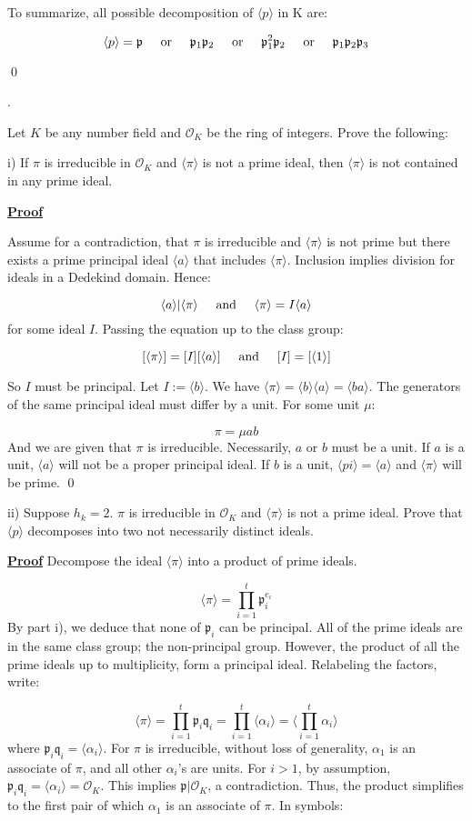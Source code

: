 \documentclass{article}
\def\contradiction{{\lightning}}
\newcounter{problemcnt}
\newcommand{\Problem}{{
    \vspace{5mm}
    \stepcounter{problemcnt}
    \noindent
    \arabic{problemcnt}. 
}
}
\newcommand{\Proof}{{
    \vspace{2mm}
    \noindent
    \textbf{
    \underline{Proof}}
}
}
\newcommand{\textOr}{
    \hspace{5mm}
    \textrm{or}
    \hspace{5mm}
}
\newcommand{\textAnd}{
    \hspace{5mm}
    \textrm{and}
    \hspace{5mm}
}
\newcommand{\<}{{{
    \langle
}}}
\def\>{{{
    \rangle
}}}
\newcommand{\ringInt}{
    {\mathcal{O}}
}
\newcommand{\pideal}{
    {{\mathfrak{p}}}
}
\newcommand{\qideal}{
    {{\mathfrak{q}}}
}
\begin{document}
To summarize, all possible decomposition of $\<p\>$ in K are:

\[
\<p\> = \pideal \textOr \pideal_1 \pideal_2 
 \textOr \pideal^2_1\pideal_2 \textOr \pideal_1\pideal_2\pideal_3
\]

\qed

\Problem 
Let $K$ be any number field and $\ringInt_K$ be the ring of integers. 
Prove the following:

i) If $\pi$ is irreducible in $\ringInt_K$ and $\<\pi\>$ is not 
a prime ideal, then $\<\pi\>$ is not contained in any prime ideal.

\Proof
Assume for a contradiction, that $\pi$ is irreducible and $\<\pi\>$ 
is not prime but there exists a prime principal ideal $\<a\>$ that includes  
$\<\pi\>$. Inclusion implies division for ideals in a Dedekind domain. Hence:

\[
    \<a\>|\<\pi\> \textAnd \<\pi\> = I\<a\>
\]
for some ideal $I$. Passing the equation up to the class group:

\[
    [\<\pi\>] = [I][\<a\>] \textAnd [I] = [\<1\>]
\]

So $I$ must be principal. Let $I := \<b\>$. We have 
$\<\pi\> = \<b\>\<a\> = \<ba\>$. The generators of the same 
principal ideal must differ by a unit. For some unit $\mu$:

\[
    \pi = \mu ab 
\]
And we are given that $\pi$ is irreducible. Necessarily, 
$a$ or $b$ must be a unit. If $a$ is a unit, $\<a\>$ will not 
be a proper principal ideal. If $b$ is a unit, $\<pi\> = \<a\>$ 
and $\<\pi\>$ will be prime. \contradiction \qed

ii) Suppose $h_k = 2$. $\pi$ is irreducible in $\ringInt_K$ and 
$\<\pi\>$ is not a prime ideal. Prove that $\<p\>$ decomposes 
into two not necessarily distinct ideals. 

\Proof Decompose the ideal $\<\pi\>$ into a product of prime ideals. 

\[
    \<\pi\> = \prod_{i = 1}^{t}\pideal_i^{e_i}
\]
By part i), we deduce that none of $\pideal_i$ can be principal. 
All of the prime ideals are in the same class group; the non-principal 
group. However, the product of all the prime ideals up to multiplicity, 
form a principal ideal. Relabeling the factors, write:

\[
    \<\pi\> = \prod_{i = 1}^t \pideal_i \qideal_i = \prod_{i = 1}^t\<\alpha_i\>
    = 
    \bigg\langle
    \prod_{i = 1}^t\alpha_i
    \bigg\rangle
\]
where $\pideal_i\qideal_i = \<\alpha_i\>$. For $\pi$ is irreducible, 
without loss of generality, $\alpha_1$ is an associate of $\pi$, 
and all other $\alpha_i$'s are units. For $i > 1$, by assumption, $\pideal_i\qideal_i = \<\alpha_i\> = 
\ringInt_K$. This implies $\pideal|\ringInt_K$, a contradiction. 
Thus, the product simplifies to the first pair of which $\alpha_1$ is an 
associate of $\pi$. In symbols:
\end{document}
